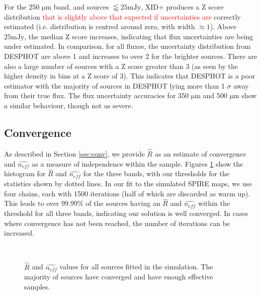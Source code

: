 \documentclass[useAMS,usenatbib]{mnras}
\begin{document}
For the 250 $\mathrm{\mu m}$ band, and sources $\lessapprox25\mathrm{m Jy}$, \textsc{XID+} produces a Z score distribution \textcolor{red}{that is slightly above that expected if uncertainties are }correctly estimated (i.e. distribution is centred around zero, with width $\approx 1$). Above $25\mathrm{mJy}$, the median Z score increases, indicating that flux uncertainties are being under estimated. In comparison, for all fluxes, the uncertainty distribution from \textsc{DESPHOT} are above 1 and increases to over 2 for the brighter sources. There are also a large number of sources with a Z score greater than 3 (as seen by the higher density in bins at a Z score of 3). This indicates that \textsc{DESPHOT} is a poor estimator with the majority of sources in \textsc{DESPHOT} lying more than 1 $\sigma$ away from their true flux. The flux uncertainty accuracies for 350 $\mathrm{\mu m}$ and 500 $\mathrm{\mu m}$ show a similar behaviour, though not as severe.

\subsection{Convergence}
As described in Section \ref{sec:conv}, we provide $\hat{R}$ as an estimate of convergence and $\hat{n_{eff}}$ as a measure of independence within the sample. Figures \ref{fig:converg} show the histogram for $\hat{R}$ and $\hat{n_{eff}}$ for the three bands, with our thresholds for the statistics shown by dotted lines. In our fit to the simulated SPIRE maps, we use four chains, each with 1500 iterations (half of which are discarded as warm up). This leads to over 99.99\% of the sources having an $\hat{R}$ and $\hat{n_{eff}}$ within the threshold for all three bands, indicating our solution is well converged. In cases where convergence has not been reached, the number of iterations can be increased.
\begin{figure}
\\
\caption{$\hat{R}$ and $\hat{n_{eff}}$ values for all sources fitted in the simulation. The majority of sources have converged and have enough effective samples.}\label{fig:converg}
\end{figure}
\end{document}
